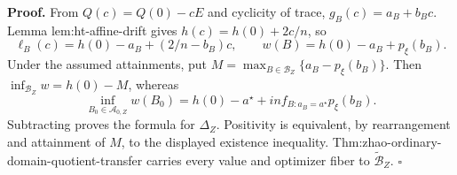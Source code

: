 \textbf{Proof.}
From \(Q(c)=Q(0)-cE\) and cyclicity of trace, \(g_B(c)=a_B+b_Bc\).  Lemma lem:ht-affine-drift gives \(h(c)=h(0)+2c/n\), so
\[
\ell_B(c)=h(0)-a_B+(2/n-b_B)c,
\qquad
w(B)=h(0)-a_B+p_\xi(b_B).
\tag{1}
\]
Under the assumed attainments, put \(M=\max_{B\in\mathcal B_Z}\{a_B-p_\xi(b_B)\}\).  Then \(\inf_{\mathcal B_Z}w=h(0)-M\), whereas
\[
\inf_{B_0\in\mathcal A_{0,Z}}w(B_0)
=h(0)-a^\star+inf_{B:a_B=a^\star}p_\xi(b_B).
\]
Subtracting proves the formula for \(\Delta_Z\).  Positivity is equivalent, by rearrangement and attainment of \(M\), to the displayed existence inequality.  Thm:zhao-ordinary-domain-quotient-transfer carries every value and optimizer fiber to \(\widetilde{\mathcal B}_Z\). \(\square\)